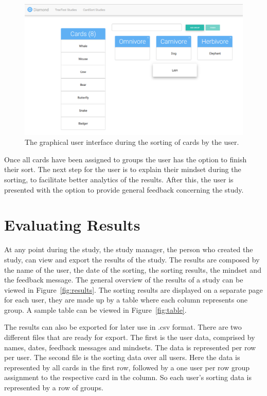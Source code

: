 \begin{figure}[tp]  \centering
\includegraphics[keepaspectratio,width=\linewidth,height=\halfh]{images/implementation/sorting.png}
\caption[Card Sorting Interface] 
{The graphical user interface during the sorting of cards by the user.
 } 
\label{fig:sorting} 
\end{figure}

Once all cards have been assigned to groups the user has the option to finish
their sort. The next step for the user is to explain their mindset during the
sorting, to facilitate better analytics of the results. After this, the user is
presented with the option to provide general feedback concerning the study.

\section{Evaluating Results}

At any point during the study, the study manager, the person who created the
study, can view and export the results of the study. The results are composed by
the name of the user, the date of the sorting, the sorting results, the mindset
and the feedback message. The general overview of the results of a study can be
viewed in Figure~\ref{fig:results}. The sorting results are displayed on a
separate page for each user, they are made up by a table where each column
represents one group. A sample table can be viewed in Figure~\ref{fig:table}.

The results can also be exported for later use in .csv format. There are two
different files that are ready for export. The first is the user data, comprised
by names, dates, feedback messages and mindsets. The data is represented per row
per user. The second file is the sorting data over all users. Here the data is
represented by all cards in the first row, followed by a one user per row group
assignment to the respective card in the column. So each user's sorting data is
represented by a row of groups.

